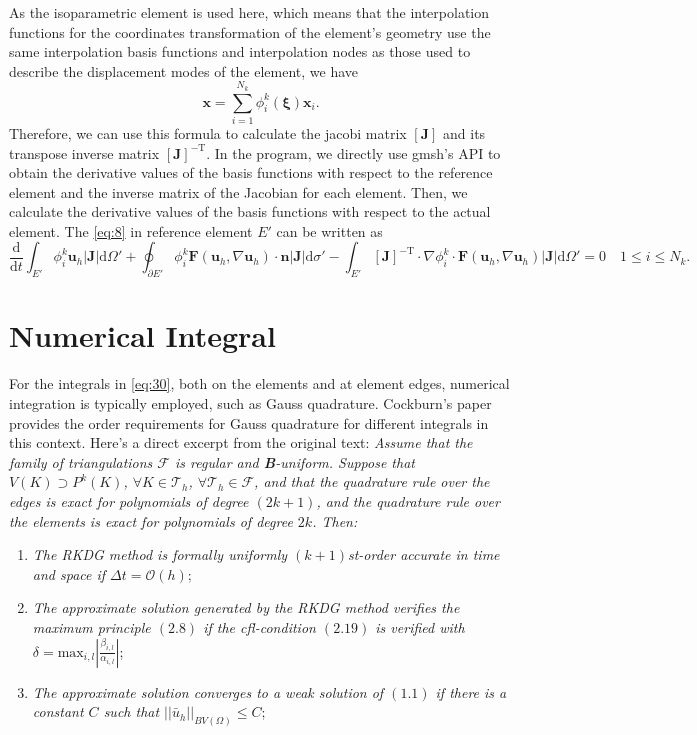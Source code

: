 \documentclass{develop-note}
\begin{document}
As the isoparametric element is used here, which means that the interpolation functions for the coordinates transformation of the element's geometry use the same interpolation basis functions and interpolation nodes as those used to describe the displacement modes of the element, we have
\begin{equation}
  \mathbf{x}=\sum_{i=1}^{N_{k}}\phi_{i}^{k}(\bm{\xi})\mathbf{x}_{i}.
\end{equation}
Therefore, we can use this formula to calculate the jacobi matrix $[\mathbf{J}]$ and its transpose inverse matrix $[\mathbf{J}]^{-\mathrm{T}}$. In the program, we directly use gmsh's API to obtain the derivative values of the basis functions with respect to the reference element and the inverse matrix of the Jacobian for each element. Then, we calculate the derivative values of the basis functions with respect to the actual element. The \autoref{eq:8} in reference element $E'$ can be written as
\begin{equation}
  \label{eq:30}
  \dfrac{\mathrm{d}}{\mathrm{d}t}\int_{E'}\phi_{i}^{k}\mathbf{u}_{h}|\mathbf{J}|\mathrm{d}\Omega'+\oint_{\partial E'}\phi_{i}^{k}\mathbf{F}(\mathbf{u}_{h},\nabla\mathbf{u}_{h})\cdot\mathbf{n}|\mathbf{J}|\mathrm{d}\sigma'-\int_{E'}[\mathbf{J}]^{-\mathrm{T}}\cdot\nabla\phi_{i}^{k}\cdot\mathbf{F}(\mathbf{u}_{h},\nabla\mathbf{u}_{h})|\mathbf{J}|\mathrm{d}\Omega'=0\quad 1\leqslant i\leqslant N_{k}.
\end{equation}

\section{Numerical Integral}

For the integrals in \autoref{eq:30}, both on the elements and at element edges, numerical integration is typically employed, such as Gauss quadrature. Cockburn's paper\cite{cockburnRungeKuttaLocalProjection1990} provides the order requirements for Gauss quadrature for different integrals in this context. Here's a direct excerpt from the original text: \textit{Assume that the family of triangulations $\mathscr{F}$ is regular and \textbf{B}-uniform. Suppose that $V(K)\supset P^{k}(K)$, $\forall K\in\mathscr{T}_{h}$, $\forall\mathscr{T}_{h}\in\mathscr{F}$, and that the quadrature rule over the edges is exact for polynomials of degree $(2k +1)$, and the quadrature rule over the elements is exact for polynomials of degree $2k$. Then:}
\begin{enumerate}
  \item \textit{The RKDG method is formally uniformly $(k+1)$st-order accurate in time and space if $\Delta t=\mathcal{O}(h)$};
  \item \textit{The approximate solution generated by the RKDG method verifies the maximum principle $(2.8)$ if the cfl-condition $(2.19)$ is verified with $\delta=\mathrm{max}_{i,l}\left|\frac{\beta_{i,l}}{\alpha_{i,l}}\right|$};
  \item \textit{The approximate solution converges to a weak solution of $(1.1)$ if there is a constant $C$ such that $||\bar{u}_{h}||_{BV(\Omega)}\le C$};
\end{enumerate}
\end{document}
